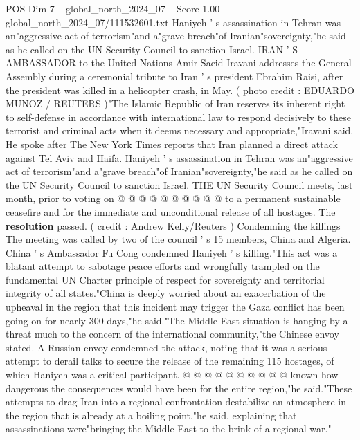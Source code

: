 \begin{textsample}{POS Dim 7 – global\_north\_2024\_07 – Score 1.00 – global\_north\_2024\_07/111532601.txt}  \label{ex:f7_pos_334}
Haniyeh ' s assassination in Tehran was an"aggressive act of terrorism"and a"grave breach"of Iranian"sovereignty,"he said as he called on the UN Security Council to sanction Israel.
IRAN ' S AMBASSADOR to the United Nations Amir Saeid Iravani addresses the General Assembly during a ceremonial tribute to Iran ' s president Ebrahim Raisi, after the president was killed in a helicopter crash, in May. ( photo credit : EDUARDO MUNOZ / REUTERS )"The Islamic Republic of Iran reserves its inherent right to self-defense in accordance with international law to respond decisively to these terrorist and criminal acts when it deems necessary and appropriate,"Iravani said.
He spoke after The New York Times reports that Iran planned a direct attack against Tel Aviv and Haifa.
Haniyeh ' s assassination in Tehran was an"aggressive act of terrorism"and a"grave breach"of Iranian"sovereignty,"he said as he called on the UN Security Council to sanction Israel.
THE UN Security Council meets, last month, prior to voting on @ @ @ @ @ @ @ @ @ @ to a permanent sustainable ceasefire and for the immediate and unconditional release of all hostages.
The \textbf{resolution} passed. ( credit : Andrew Kelly/Reuters ) Condemning the killings The meeting was called by two of the council ' s 15 members, China and Algeria.
China ' s Ambassador Fu Cong condemned Haniyeh ' s killing."This act was a blatant attempt to sabotage peace efforts and wrongfully trampled on the fundamental UN Charter principle of respect for sovereignty and territorial integrity of all states."China is deeply worried about an exacerbation of the upheaval in the region that this incident may trigger the Gaza conflict has been going on for nearly 300 days,"he said."The Middle East situation is hanging by a threat much to the concern of the international community,"the Chinese envoy stated.
A Russian envoy condemned the attack, noting that it was a serious attempt to derail talks to secure the release of the remaining 115 hostages, of which Haniyeh was a critical participant. @ @ @ @ @ @ @ @ @ @ known how dangerous the consequences would have been for the entire region,"he said."These attempts to drag Iran into a regional confrontation destabilize an atmosphere in the region that is already at a boiling point,"he said, explaining that assassinations were"bringing the Middle East to the brink of a regional war."

\end{textsample}
